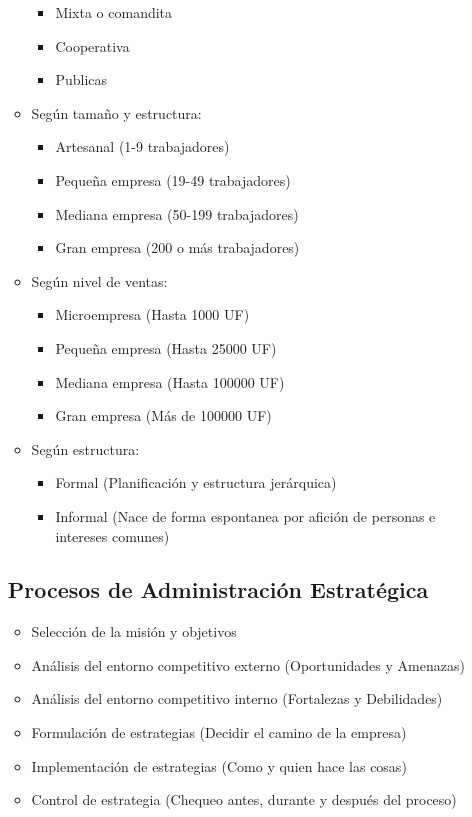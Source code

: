\documentclass{templateNote}
\begin{document}
\begin{itemize}
\begin{itemize}
\begin{itemize}
                \item Mixta o comandita
                \item Cooperativa
                \item Publicas
            \end{itemize}
        \item Según tamaño y estructura:
            \begin{itemize}
                \item Artesanal (1-9 trabajadores)
                \item Pequeña empresa (19-49 trabajadores)
                \item Mediana empresa (50-199 trabajadores)
                \item Gran empresa (200 o más trabajadores)
            \end{itemize}
        \item Según nivel de ventas:
            \begin{itemize}
                \item Microempresa (Hasta 1000 UF)
                \item Pequeña empresa (Hasta 25000 UF)
                \item Mediana empresa (Hasta 100000 UF)
                \item Gran empresa (Más de 100000 UF)
            \end{itemize}
        \item Según estructura:
            \begin{itemize}
                \item Formal (Planificación y estructura jerárquica)
                \item Informal (Nace de forma espontanea por afición de personas e intereses comunes)   
            \end{itemize}
    \end{itemize}

    \newpage
    \subsection{Procesos de Administración Estratégica}
    \begin{itemize}
        \item Selección de la misión y objetivos
        \item Análisis del entorno competitivo externo (Oportunidades y Amenazas)       
        \item Análisis del entorno competitivo interno (Fortalezas y Debilidades)
        \item Formulación de estrategias (Decidir el camino de la empresa)
        \item Implementación de estrategias (Como y quien hace las cosas)
        \item Control de estrategia (Chequeo antes, durante y después del proceso)
    \end{itemize}


\end{itemize}
\end{document}
